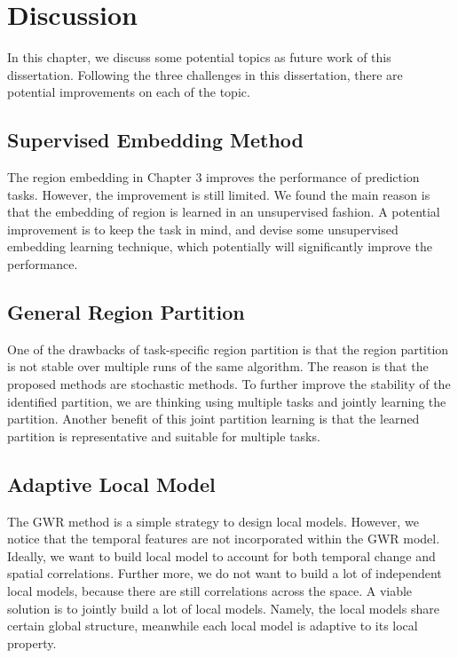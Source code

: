 \chapter{Discussion}
\label{ch:conclusion}


In this chapter, we discuss some potential topics as future work of this dissertation. Following the three challenges in this dissertation, there are potential improvements on each of the topic.

\section{Supervised Embedding Method}

The region embedding in Chapter 3 improves the performance of prediction tasks. However, the improvement is still limited. We found the main reason is that the embedding of region is learned in an unsupervised fashion. A potential improvement is to keep the task in mind, and devise some unsupervised embedding learning technique, which potentially will significantly improve the performance.

\section{General Region Partition}

One of the drawbacks of task-specific region partition is that the region partition is not stable over multiple runs of the same algorithm. The reason is that the proposed methods are stochastic methods. To further improve the stability of the identified partition, we are thinking using multiple tasks and jointly learning the partition. Another benefit of this joint partition learning is that the learned partition is representative and suitable for multiple tasks.


\section{Adaptive Local Model}

The GWR method is a simple strategy to design local models. However, we notice that the temporal features are not incorporated within the GWR model. Ideally, we want to build local model to account for both temporal change and spatial correlations. Further more, we do not want to build a lot of independent local models, because there are still correlations across the space. A viable solution is to jointly build a lot of local models. Namely, the local models share certain global structure, meanwhile each local model is adaptive to its local property.